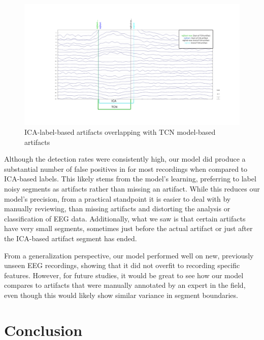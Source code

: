 \documentclass[12pt,a4paper,titlepage,openany]{report}
\begin{document}
\begin{figure}[H]
     \centering
     \includegraphics[width=1\linewidth]{./misc/artifact-overlaps.png}
     \caption{ICA-label-based artifacts overlapping with TCN model-based artifacts}
     \label{fig:overlaps}
\end{figure}

Although the detection rates were consistently high, our model did produce a substantial number of false positives in for most recordings when compared to ICA-based labels. This likely stems from the model's learning, preferring to label noisy segments as artifacts rather than missing an artifact. While this reduces our model's precision, from a practical standpoint it is easier to deal with by manually reviewing, than missing artifacts and distorting the analysis or classification of EEG data. Additionally, what we saw is that certain artifacts have very small segments, sometimes just before the actual artifact or just after the ICA-based artifact segment has ended.

From a generalization perspective, our model performed well on new, previously unseen EEG recordings, showing that it did not overfit to recording specific features. However, for future studies, it would be great to see how our model compares to artifacts that were manually annotated by an expert in the field, even though this would likely show similar variance in segment boundaries.



\chapter{Conclusion}
\thispagestyle{fancy}
\end{document}
